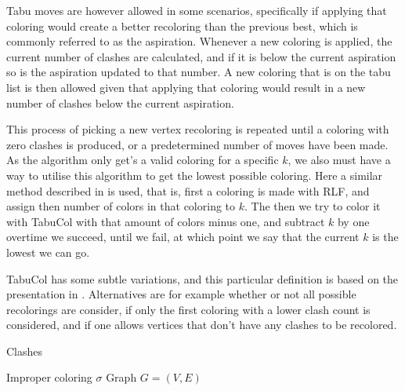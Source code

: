 \documentclass[a4paper]{article}
\begin{document}
Tabu moves are however allowed in some scenarios, specifically if applying that
coloring would create a better recoloring than the previous best, which is
commonly referred to as the aspiration. Whenever a new coloring is applied, the
current number of clashes are calculated, and if it is below the current
aspiration so is the aspiration updated to that number.  A new coloring that is
on the tabu list is then allowed given that applying that coloring would result
in a new number of clashes below the current aspiration.

This process of picking a new vertex recoloring is repeated until a coloring
with zero clashes is produced, or a predetermined number of moves have been
made. As the algorithm only get's a valid coloring for a specific $k$, we also
must have a way to utilise this algorithm to get the lowest possible coloring.
Here a similar method described in \cite{Constructive} is used, that is, first a
coloring is made with RLF, and assign then number of colors in that coloring to
$k$.  The then we try to color it with TabuCol with that amount of colors minus
one, and subtract $k$ by one overtime we succeed, until we fail, at which point
we say that the current $k$ is the lowest we can go.

TabuCol has some subtle variations, and this particular definition is based on
the presentation in \cite{Constructive}. Alternatives are for example whether or
not all possible recolorings are consider, if only the first coloring with a
lower clash count is considered, and if one allows vertices that don't have any
clashes to be recolored.

\begin{algorithm}[H]
    \caption{Clashes}
    \begin{algorithmic}[1]
        \REQUIRE Improper coloring $\sigma$
        \REQUIRE Graph $G = (V,E)$
    \end{algorithmic}
\end{algorithm}
\end{document}
